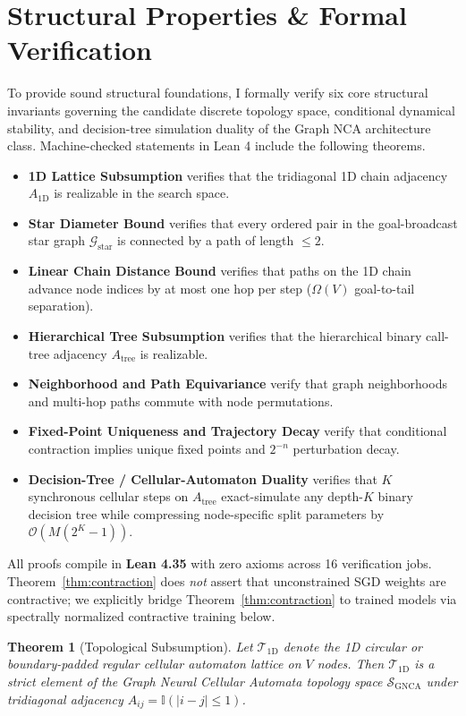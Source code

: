 \documentclass[10pt,twocolumn,letterpaper]{article}
\newtheorem{theorem}{Theorem}
\begin{document}
\section{Structural Properties \& Formal Verification}\label{sec:formal-verification}
To provide sound structural foundations, I formally verify six core structural invariants governing the candidate discrete topology space, conditional dynamical stability, and decision-tree simulation duality of the Graph NCA architecture class. Machine-checked statements in Lean 4 include the following theorems.
\begin{itemize}[leftmargin=1.5em, itemsep=0.05em]
  \item \textbf{1D Lattice Subsumption} verifies that the tridiagonal 1D chain adjacency $A_{\text{1D}}$ is realizable in the search space.
  \item \textbf{Star Diameter Bound} verifies that every ordered pair in the goal-broadcast star graph $\mathcal{G}_{\text{star}}$ is connected by a path of length $\le 2$.
  \item \textbf{Linear Chain Distance Bound} verifies that paths on the 1D chain advance node indices by at most one hop per step ($\Omega(V)$ goal-to-tail separation).
  \item \textbf{Hierarchical Tree Subsumption} verifies that the hierarchical binary call-tree adjacency $A_{\text{tree}}$ is realizable.
  \item \textbf{Neighborhood and Path Equivariance} verify that graph neighborhoods and multi-hop paths commute with node permutations.
  \item \textbf{Fixed-Point Uniqueness and Trajectory Decay} verify that conditional contraction implies unique fixed points and $2^{-n}$ perturbation decay.
  \item \textbf{Decision-Tree / Cellular-Automaton Duality} verifies that $K$ synchronous cellular steps on $A_{\text{tree}}$ exact-simulate any depth-$K$ binary decision tree while compressing node-specific split parameters by $\mathcal{O}(M(2^K - 1))$.
\end{itemize}
All proofs compile in \textbf{Lean 4.35} with zero axioms across 16 verification jobs. Theorem~\ref{thm:contraction} does \emph{not} assert that unconstrained SGD weights are contractive; we explicitly bridge Theorem~\ref{thm:contraction} to trained models via spectrally normalized contractive training below.

\begin{theorem}[Topological Subsumption]\label{thm:subsumption}
Let $\mathcal{T}_{\mathrm{1D}}$ denote the 1D circular or boundary-padded regular cellular automaton lattice on $V$ nodes. Then $\mathcal{T}_{\mathrm{1D}}$ is a strict element of the Graph Neural Cellular Automata topology space $\mathcal{S}_{\mathrm{GNCA}}$ under tridiagonal adjacency $A_{ij} = \mathbb{I}(|i - j| \le 1)$.
\end{theorem}
\end{document}
